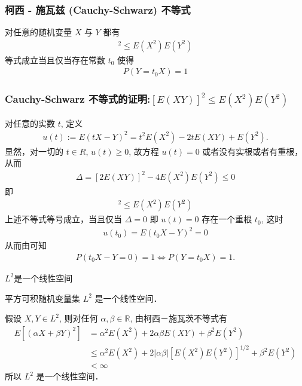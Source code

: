\documentclass[Prob-All.tex]{subfiles}
\begin{document}
\begin{frame}
	\frametitle{柯西 - 施瓦兹 (Cauchy-Schwarz) 不等式}
	\begin{thm}
		对任意的随机变量 $X$ 与 $Y$ 都有
		\begin{eqnarray*}
			[E(XY)]^2\le E(X^2)E(Y^2)
		\end{eqnarray*}
		等式成立当且仅当存在常数 $t_0$ 使得
		\begin{eqnarray*}
			P(Y=t_0X)=1
		\end{eqnarray*}
	\end{thm}

\end{frame}
\begin{frame}
	\frametitle{Cauchy-Schwarz 不等式的证明:$[E (XY)]^2\le E (X^2) E (Y^2)
		$}

	\zheng 对任意的实数 $t$, 定义
	\begin{eqnarray*}
		u(t):=E(tX-Y)^2=t^2E(X^2)-2tE(XY)+E(Y^2).
	\end{eqnarray*}
	\pause 显然，对一切的 $t\in R$, $u (t)\ge 0$, 故方程 $u (t)=0$ 或者没有实根或者有重根，从而
	\pause \begin{eqnarray*}
		\Delta=[2E(XY)]^2-4E(X^2)E(Y^2)\le 0
	\end{eqnarray*}
	\pause  即
	\begin{eqnarray*}
		[E(XY)]^2\le E(X^2)E(Y^2)
	\end{eqnarray*}
	\pause 上述不等式等号成立，当且仅当 $\Delta=0$ 即 $u (t)=0$ 存在一个重根 $t_0$, 这时
	\begin{eqnarray*}
		u(t_0)=E(t_0X-Y)^2=0
	\end{eqnarray*}
	\pause 从而由可知 %
	\begin{eqnarray*}
		P(t_0X-Y=0)=1 \Leftrightarrow P(Y=t_0X)=1.
	\end{eqnarray*}

\end{frame}

\begin{frame}{$L^2$是一个线性空间}
\begin{prop}
平方可积随机变量集 $L^{2}$ 是一个线性空间．
\end{prop}
\pause

\vspace{0.5cm}
\zheng 假设 $X, Y \in L^{2}$, 则对任何 $\alpha, \beta \in \mathbb{R}$, 由柯西－施瓦茨不等式有
\begin{align*}
   E\left[(\alpha X+\beta Y)^{2}\right]  &=\alpha^{2} E\left(X^{2}\right)+2 \alpha \beta E(X Y)+\beta^{2} E\left(Y^{2}\right) \\
&\leqslant \alpha^{2} E\left(X^{2}\right)+2|\alpha \beta|\left[E\left(X^{2}\right) E\left(Y^{2}\right)\right]^{1 / 2}+\beta^{2} E\left(Y^{2}\right)\\
&<\infty
\end{align*}
\pause 所以 $L^{2}$ 是一个线性空间．
\end{frame}
\end{document}
